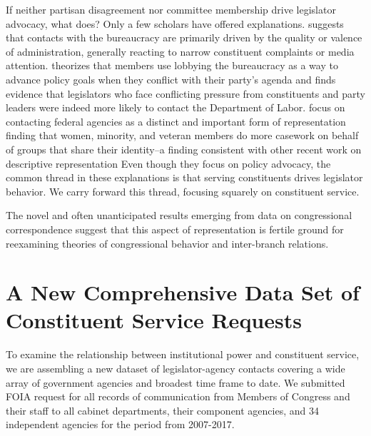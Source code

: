 \documentclass{article}
\begin{document}
If neither partisan disagreement nor committee membership drive legislator advocacy, what does? Only a few scholars have offered explanations.
\citet{Lowande2018JOP} suggests that contacts with the bureaucracy are primarily driven by the quality or valence of administration, generally reacting to narrow constituent complaints or media attention. 
\citet{Ritchie2017} theorizes that members use lobbying the bureaucracy as a way to advance policy goals when they conflict with their party's agenda and finds evidence that legislators who face conflicting pressure from constituents and party leaders were indeed more likely to contact the Department of Labor. 
\citet{LowandeRitchieLauterbach2018} focus on contacting federal agencies as a distinct and important form of representation finding that women, minority, and veteran members do more casework on behalf of groups that share their identity--a finding consistent with other recent work on descriptive representation %
Even though they focus on policy advocacy, the common thread in these explanations is that serving constituents drives legislator behavior. We carry forward this thread, focusing squarely on constituent service. 

The novel and often unanticipated results emerging from data on congressional correspondence suggest that this aspect of representation is fertile ground for reexamining theories of congressional behavior and inter-branch relations. 




\section{A New Comprehensive Data Set of Constituent Service Requests} 
To examine the relationship between institutional power and constituent service, we are assembling a new dataset of legislator-agency contacts covering a wide array of government agencies and broadest time frame to date. We submitted FOIA request for all records of communication from Members of Congress and their staff to all cabinet departments, their component agencies, and 34 independent agencies for the period from 2007-2017.
\end{document}
